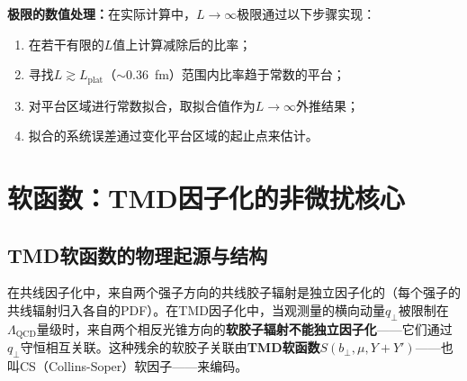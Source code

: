 \documentclass[12pt,a4paper]{ctexart}
\theoremstyle{definition}
\begin{document}
\textbf{极限的数值处理：}在实际计算中，$L\to\infty$极限通过以下步骤实现：
\begin{enumerate}
    \item 在若干有限的$L$值上计算减除后的比率；
    \item 寻找$L \gtrsim L_{\text{plat}}$（$\sim 0.36$~fm）范围内比率趋于常数的平台；
    \item 对平台区域进行常数拟合，取拟合值作为$L\to\infty$外推结果；
    \item 拟合的系统误差通过变化平台区域的起止点来估计。
\end{enumerate}

\section{软函数：TMD因子化的非微扰核心}

\subsection{TMD软函数的物理起源与结构}

在共线因子化中，来自两个强子方向的共线胶子辐射是独立因子化的（每个强子的共线辐射归入各自的PDF）。在TMD因子化中，当观测量的横向动量$q_\perp$被限制在$\Lambda_{\text{QCD}}$量级时，来自两个相反光锥方向的\textbf{软胶子辐射不能独立因子化}——它们通过$q_\perp$守恒相互关联。这种残余的软胶子关联由\textbf{TMD软函数}$S(b_\perp, \mu, Y+Y')$——也叫CS（Collins-Soper）软因子——来编码。
\end{document}
